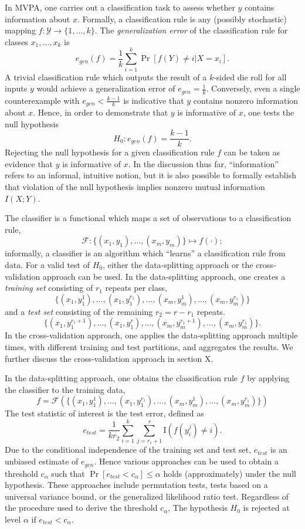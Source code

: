 \documentclass[12pt]{article}
\begin{document}
In MVPA, one carries out a classification task to assess whether $y$
contains information about $x$.  Formally, a classification rule is
any (possibly stochastic) mapping $f: \mathcal{Y} \to \{1,\hdots,
k\}$.  The \emph{generalization error} of the classification rule for classes $x_1,\hdots, x_k$ is
\[
e_{gen}(f) = \frac{1}{k} \sum_{i=1}^k\Pr[f(Y) \neq i | X = x_i].
\]
A trivial classification rule which outputs the result of a $k$-sided
die roll for all inputs $y$ would achieve a generalization error of
$e_{gen} = \frac{1}{k}$.  Conversely, even a single counterexample
with $e_{gen} < \frac{k-1}{k}$ is indicative that $y$ contains nonzero
information about $x$.  Hence, in order to demonstrate that $y$ is
informative of $x$, one tests the null hypothesis
\[
H_0: e_{gen}(f) = \frac{k-1}{k}.
\]
Rejecting the null hypothesis for a given classification rule $f$ can
be taken as evidence that $y$ is informative of $x$.  In the
discussion thus far, ``information'' refers to an informal, intuitive
notion, but it is also possible to formally establish that violation
of the null hypothesis implies nonzero mutual information $I(X; Y)$.

The classifier is a functional which maps a set of observations to a classification rule,
\[
\mathcal{F}: \{(x_1,y_1),\hdots, (x_m, y_m)\} \mapsto f(\cdot);
\]
informally, a classifier is an algorithm which ``learns'' a classification rule from data.
For a valid test of $H_0$, 
either the data-splitting approach or the cross-validation approach can be used.
In the data-splitting approach, one creates a \emph{training set} consisting of $r_1$ repeats per class,
\[
\{(x_1, y_1^1),\hdots, (x_1,y_1^{r_1}), \hdots, (x_m, y_m^1),\hdots, (x_m,y_m^{r_1})\}
\]
and a \emph{test set} consisting of the remaining $r_2 = r - r_1$ repeats.
\[
\{(x_1, y_1^{r_1 + 1}),\hdots, (x_1,y_1^{r}), \hdots, (x_m, y_m^{r_1 + 1}),\hdots, (x_m,y_m^{r_1})\}.
\]
In the cross-validation approach, one applies the data-splitting
approach multiple times, with different training and test partitions,
and aggregates the results.  We further discuss the cross-validation
approach in section X.

In the data-splitting approach, one obtains the classification rule $f$ by applying the classifier to the training data,
\[
f = \mathcal{F}(\{(x_1, y_1^1),\hdots, (x_1,y_1^{r_1}), \hdots, (x_m, y_m^1),\hdots, (x_m,y_m^{r_1})\})
\]
The test statistic of interest is the test error,
defined as
\[
e_{test} = \frac{1}{k r_2} \sum_{i=1}^k \sum_{j = r_1 + 1}^r \text{I}(f(y_i^j) \neq i).
\]
Due to the conditional independence of the training set and test set,
$e_{test}$ is an unbiased estimate of $e_{gen}$.  Hence various
approaches can be used to obtain a threshold $c_\alpha$ such that
$\Pr[e_{test} < c_\alpha] \leq \alpha$ holds (approximately) under the
null hypothesis.  These approaches include permutation tests,
tests based on a universal variance bound, or the generalized
likelihood ratio test.  Regardless of the procedure used to derive the
threshold $c_\alpha$, The hypothesis $H_0$ is rejected at level
$\alpha$ if $e_{test} < c_\alpha$.
\end{document}
